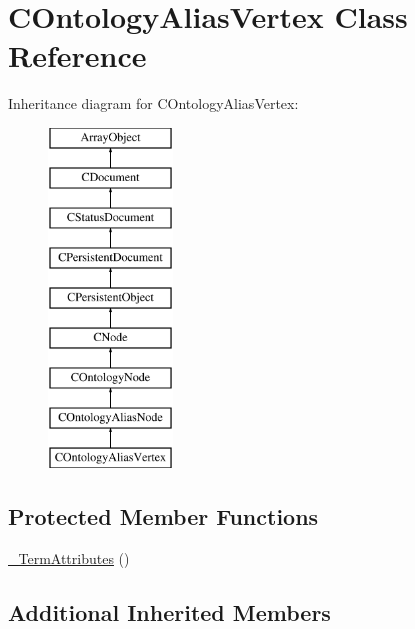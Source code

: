 \hypertarget{class_c_ontology_alias_vertex}{\section{C\-Ontology\-Alias\-Vertex Class Reference}
\label{class_c_ontology_alias_vertex}
}
Inheritance diagram for C\-Ontology\-Alias\-Vertex\-:\begin{figure}[H]
\begin{center}
\leavevmode
\includegraphics[height=9.000000cm]{class_c_ontology_alias_vertex}
\end{center}
\end{figure}
\subsection*{Protected Member Functions}
\begin{DoxyCompactItemize}
\item 
\hyperlink{class_c_ontology_alias_vertex_ae9bc78a01ea4f6f4adfa4fc5a9906adf}{\-\_\-\-Term\-Attributes} ()
\end{DoxyCompactItemize}
\subsection*{Additional Inherited Members}



